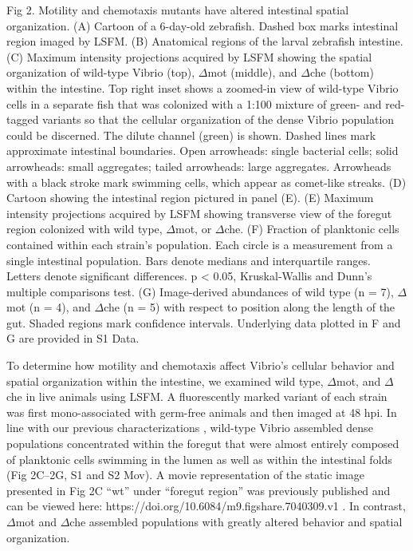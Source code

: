 Fig 2. Motility and chemotaxis mutants have altered intestinal spatial organization. 
(A) Cartoon of a 6-day-old zebrafish. Dashed box marks intestinal region imaged by LSFM. (B) Anatomical regions of the larval zebrafish intestine. (C) Maximum intensity projections acquired by LSFM showing the spatial organization of wild-type Vibrio (top), $\Delta$mot (middle), and $\Delta$che (bottom) within the intestine. Top right inset shows a zoomed-in view of wild-type Vibrio cells in a separate fish that was colonized with a 1:100 mixture of green- and red-tagged variants so that the cellular organization of the dense Vibrio population could be discerned. The dilute channel (green) is shown. Dashed lines mark approximate intestinal boundaries. Open arrowheads: single bacterial cells; solid arrowheads: small aggregates; tailed arrowheads: large aggregates. Arrowheads with a black stroke mark swimming cells, which appear as comet-like streaks. (D) Cartoon showing the intestinal region pictured in panel (E). (E) Maximum intensity projections acquired by LSFM showing transverse view of the foregut region colonized with wild type, $\Delta$mot, or $\Delta$che. (F) Fraction of planktonic cells contained within each strain's population. Each circle is a measurement from a single intestinal population. Bars denote medians and interquartile ranges. Letters denote significant differences. p < 0.05, Kruskal-Wallis and Dunn's multiple comparisons test. (G) Image-derived abundances of wild type (n = 7), $\Delta$mot (n = 4), and $\Delta$che (n = 5) with respect to position along the length of the gut. Shaded regions mark confidence intervals. Underlying data plotted in F and G are provided in S1 Data.

To determine how motility and chemotaxis affect Vibrio's cellular behavior and spatial organization within the intestine, we examined wild type, $\Delta$mot, and $\Delta$che in live animals using LSFM. A fluorescently marked variant of each strain was first mono-associated with germ-free animals and then imaged at 48 hpi. In line with our previous characterizations \cite{wiles_modernized_2018,schlomann_bacterial_2018}, wild-type Vibrio assembled dense populations concentrated within the foregut that were almost entirely composed of planktonic cells swimming in the lumen as well as within the intestinal folds (Fig 2C–2G, S1 and S2 Mov). A movie representation of the static image presented in Fig 2C ``wt'' under ``foregut region'' was previously published and can be viewed here: https://doi.org/10.6084/m9.figshare.7040309.v1 \cite{wiles_modernized_2018}. In contrast, $\Delta$mot and $\Delta$che assembled populations with greatly altered behavior and spatial organization. 

